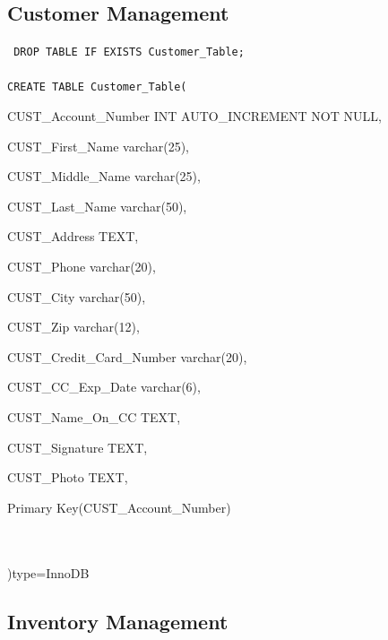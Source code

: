 \documentclass{report}
\begin{document}
    \subsection{Customer Management}
	{\tt\small
	DROP TABLE IF EXISTS Customer\_Table;\\
	\\
	CREATE TABLE Customer\_Table(\\
	\begin{list}{}
		\item{CUST\_Account\_Number             INT AUTO\_INCREMENT NOT NULL,}
		\item{CUST\_First\_Name                 varchar(25),}
		\item{CUST\_Middle\_Name                varchar(25),}
		\item{CUST\_Last\_Name                  varchar(50),}
		\item{CUST\_Address                    TEXT,}
		\item{CUST\_Phone                      varchar(20),}
		\item{CUST\_City                       varchar(50),}
		\item{CUST\_Zip                        varchar(12),}
		\item{CUST\_Credit\_Card\_Number         varchar(20),}
		\item{CUST\_CC\_Exp\_Date                varchar(6),}
		\item{CUST\_Name\_On\_CC                 TEXT,}
		\item{CUST\_Signature                  TEXT,}
		\item{CUST\_Photo                      TEXT,}
		\item{Primary Key(CUST\_Account\_Number)}
	\end{list}\\
	\\
	)type=InnoDB
	}

    \subsection{Inventory Management}
\end{document}

